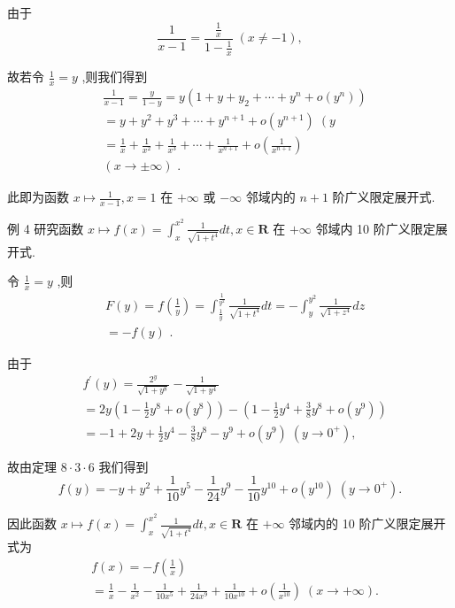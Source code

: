 由于
$$\frac{1}{x - 1} = \frac{\frac{1}{x}}{1 - \frac{1}{x}}\;\left( {x \neq   - 1}\right) ,$$

故若令 $\frac{1}{x} = y$ ,则我们得到
\begin{align*}
	&\frac{1}{x - 1} = \frac{y}{1 - y} = y\left( {1 + y + {y}_{2} + \cdots  + {y}^{n} + o\left( {y}^{n}\right) }\right)\\
	&= y + {y}^{2} + {y}^{3} + \cdots  + {y}^{n + 1} + o\left( {y}^{n + 1}\right) \;\left( y\right.\\
	&= \frac{1}{x} + \frac{1}{{x}^{2}} + \frac{1}{{x}^{3}} + \cdots  + \frac{1}{{x}^{n + 1}} + o\left( \frac{1}{{x}^{n + 1}}\right)\\
	&\left( {x \rightarrow   \pm  \infty }\right) \text{ . }
\end{align*}

此即为函数 $x \mapsto  \frac{1}{x - 1},x = 1$ 在 $+ \infty$ 或 $- \infty$ 邻域内的 $n + 1$ 阶广义限定展开式.

例 4 研究函数 $x \mapsto  f\left( x\right)  = {\int }_{x}^{{x}^{2}}\frac{1}{\sqrt{1 + {t}^{4}}}{dt},x \in  \mathbf{R}$ 在 $+ \infty$ 邻域内 10 阶广义限定展开式.

令 $\frac{1}{x} = y$ ,则
\begin{align*}
	&F\left( y\right)  = f\left( \frac{1}{y}\right)  = {\int }_{\frac{1}{y}}^{\frac{1}{{y}^{2}}}\frac{1}{\sqrt{1 + {t}^{4}}}{dt} =  - {\int }_{y}^{{y}^{2}}\frac{1}{\sqrt{1 + {z}^{4}}}{dz}\\
	&=  - f\left( y\right) \text{ . }
\end{align*}

由于
\begin{align*}
	&{f}^{\prime }\left( y\right)  = \frac{{2}^{y}}{\sqrt{1 + {y}^{8}}} - \frac{1}{\sqrt{1 + {y}^{4}}}\\
	&= {2y}\left( {1 - \frac{1}{2}{y}^{8} + o\left( {y}^{8}\right) }\right)  - \left( {1 - \frac{1}{2}{y}^{4} + \frac{3}{8}{y}^{8} + o\left( {y}^{9}\right) }\right)\\
	&=  - 1 + {2y} + \frac{1}{2}{y}^{4} - \frac{3}{8}{y}^{8} - {y}^{9} + o\left( {y}^{9}\right) \;\left( {y \rightarrow  {0}^{ + }}\right) ,
\end{align*}

故由定理 $8 \cdot  3 \cdot  6$ 我们得到
$$f\left( y\right)  =  - y + {y}^{2} + \frac{1}{10}{y}^{5} - \frac{1}{24}{y}^{9} - \frac{1}{10}{y}^{10} + o\left( {y}^{10}\right) \;\left( {y \rightarrow  {0}^{ + }}\right) .$$

因此函数 $x \mapsto  f\left( x\right)  = {\int }_{x}^{{x}^{2}}\frac{1}{\sqrt{1 + {t}^{4}}}{dt},x \in  \mathbf{R}$ 在 $+ \infty$ 邻域内的 10 阶广义限定展开式为
\begin{align*}
	&f\left( x\right)  =  - f\left( \frac{1}{x}\right)\\
	&= \frac{1}{x} - \frac{1}{{x}^{2}} - \frac{1}{{10}{x}^{5}} + \frac{1}{{24}{x}^{9}} + \frac{1}{{10}{x}^{10}} + o\left( \frac{1}{{x}^{10}}\right) \;\left( {x \rightarrow   + \infty }\right) .
\end{align*}

